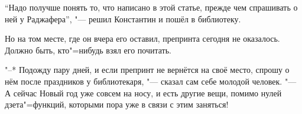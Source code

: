 \enquote{Надо получше понять то, что написано в этой статье, прежде чем
спрашивать о ней у Раджафера}, "--- решил Константин и пошёл в библиотеку.

Но на том месте, где он вчера его оставил, препринта сегодня не оказалось.
Должно быть, кто"=нибудь взял его почитать.

"--* Подожду пару дней, и если препринт не вернётся на своё место, спрошу о нём
после праздников у библиотекаря, "--- сказал сам себе молодой человек.
"--- А сейчас Новый год уже совсем на носу, и есть другие вещи, помимо нулей
дзета"=функций, которыми пора уже в связи с этим заняться!
